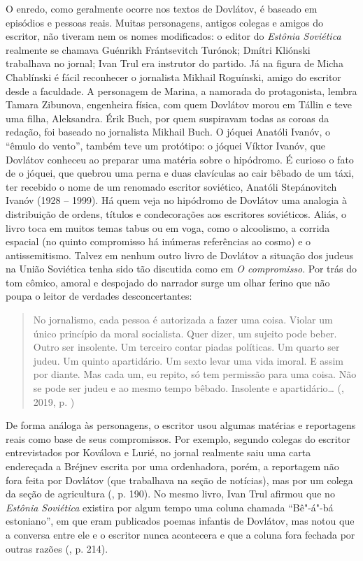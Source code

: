 O enredo, como geralmente ocorre nos textos de Dovlátov, é baseado em
episódios e pessoas reais. Muitas personagens, antigos colegas e amigos
do escritor, não tiveram nem os nomes modificados: o editor do
\emph{Estônia Soviética} realmente se chamava Guénrikh Frántsevitch
Turónok; Dmítri Kliónski trabalhava no jornal; Ivan Trul era instrutor
do partido. Já na figura de Micha Chablínski é fácil reconhecer o
jornalista Mikhail Roguínski, amigo do escritor desde a faculdade. A
personagem de Marina, a namorada do protagonista, lembra Tamara
Zibunova, engenheira física, com quem Dovlátov morou em Tállin e teve
uma filha, Aleksandra. Érik Buch, por quem suspiravam todas as coroas da
redação, foi baseado no jornalista Mikhail Buch. O jóquei Anatóli
Ivanóv, o ``êmulo do vento'', também teve um protótipo: o jóquei Víktor
Ivanóv, que Dovlátov conheceu ao preparar uma matéria sobre o hipódromo.
É curioso o fato de o jóquei, que quebrou uma perna e duas clavículas ao
cair bêbado de um táxi, ter recebido o nome de um renomado escritor
soviético, Anatóli Stepánovitch Ivanóv (1928 -- 1999). Há quem veja no
hipódromo de Dovlátov uma analogia à distribuição de ordens, títulos e
condecorações aos escritores soviéticos. Aliás, o livro toca em muitos
temas tabus ou em voga, como o alcoolismo, a corrida espacial (no quinto
compromisso há inúmeras referências ao cosmo) e o antissemitismo. Talvez
em nenhum outro livro de Dovlátov a situação dos judeus na União
Soviética tenha sido tão discutida como em \emph{O compromisso}. Por trás
do tom cômico, amoral e despojado do narrador surge um olhar ferino que
não poupa o leitor de verdades desconcertantes:

\begin{quotation}
No jornalismo, cada pessoa é autorizada a fazer uma coisa. Violar um
único princípio da moral socialista. Quer dizer, um sujeito pode beber.
Outro ser insolente. Um terceiro contar piadas políticas. Um quarto ser
judeu. Um quinto apartidário. Um sexto levar uma vida imoral. E assim
por diante. Mas cada um, eu repito, só tem permissão para uma coisa. Não
se pode ser judeu e ao mesmo tempo bêbado. Insolente e apartidário\ldots{}
{}(, 2019, p. \pageref{ref2})
\end{quotation}

De forma análoga às personagens, o escritor usou algumas matérias e
reportagens reais como base de seus compromissos. Por exemplo, segundo
colegas do escritor entrevistados por Koválova e Lurié, no jornal
realmente saiu uma carta endereçada a Bréjnev escrita por uma
ordenhadora, porém, a reportagem não fora feita por Dovlátov (que
trabalhava na seção de notícias), mas por um colega da seção de
agricultura (, p. 190). No mesmo livro, Ivan Trul afirmou que no
\emph{Estônia Soviética} existira por algum tempo uma coluna chamada
``Bê"-á"-bá estoniano'', em que eram publicados poemas infantis de
Dovlátov, mas notou que a conversa entre ele e o escritor nunca
acontecera e que a coluna fora fechada por outras razões (, p.
214).

